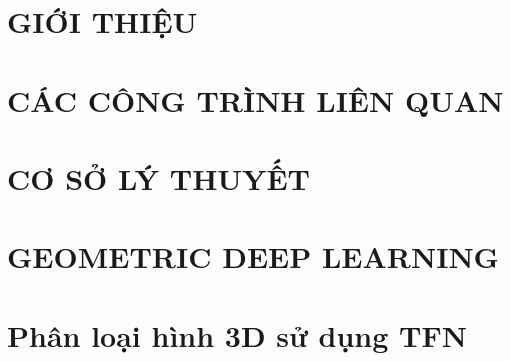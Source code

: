 \documentclass[a4paper, 12pt]{report}
\begin{document}
\renewcommand{\thepage}{\roman{page}}






%  
%
\newpage
%  
\setlength{\parskip}{0pt}


% 



\tableofcontents
{}
\listoffigures  


\newpage 

\clearpage
\setcounter{page}{1}
\setcounter{chapter}{0}

\renewcommand{\thepage}{\arabic{page}}	

\setlength{\parskip}{1em}



\chapter{GIỚI THIỆU}


\chapter{CÁC CÔNG TRÌNH LIÊN QUAN}


\chapter{CƠ SỞ LÝ THUYẾT}



\chapter{GEOMETRIC DEEP LEARNING}


\chapter{Phân loại hình 3D sử dụng TFN}

\end{document}
